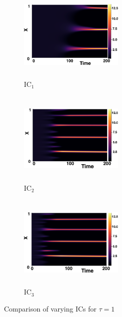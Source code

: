 \begin{figure}[H]
    \centering
    \begin{subfigure}[b]{0.32\textwidth}
        \centering
        \includegraphics[width=5cm,height=4.5cm]{gaff1.png}
        \caption{$\text{IC}_1$}
        \label{}
    \end{subfigure}
    \hfill
    \begin{subfigure}[b]{0.32\textwidth}
        \centering
        \includegraphics[width=5cm,height=4.5cm]{ic21.png}
        \caption{$\text{IC}_2$}
        \label{}
    \end{subfigure}
    \hfill
    \begin{subfigure}[b]{0.32\textwidth}
        \centering
        \includegraphics[width=5cm,height=4.5cm]{ic31.png}
        \caption{$\text{IC}_3$}
        \label{}
    \end{subfigure}
    \caption{Comparison of varying ICs for $\tau=1$}
    \label{fig:figtau1}
\end{figure}
